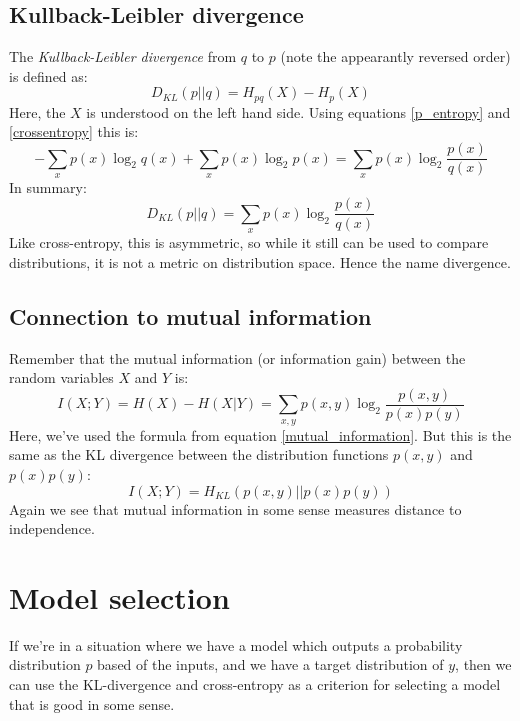 \documentclass[12pt, a4paper]{article}
\numberwithin{equation}{section}
\begin{document}
\subsection{Kullback-Leibler divergence}
The \textit{Kullback-Leibler divergence} from $q$ to $p$ (note the appearantly reversed order) is defined as:
\begin{equation}
D_{KL}(p||q)=H_{pq}(X)-H_p(X)
\end{equation} 
Here, the $X$ is understood on the left hand side. Using equations \ref{p_entropy} and \ref{crossentropy} this is:
\begin{equation}
-\sum_x p(x)\log_2 q(x)+\sum_x p(x)\log_2 p(x)=\sum_x p(x)\log_2\frac{p(x)}{q(x)}
\end{equation}
In summary:
\begin{equation}
\label{kl_divergence}
D_{KL}(p||q)=\sum_x p(x)\log_2\frac{p(x)}{q(x)}
\end{equation}
Like cross-entropy, this is asymmetric, so while it still can be used to compare distributions, it is not a metric on distribution space. Hence the name divergence.

\subsection{Connection to mutual information}
Remember that the mutual information (or information gain) between the random variables $X$ and $Y$ is:
\begin{equation}
I(X;Y)=H(X)-H(X|Y)=\sum_{x,y}p(x,y)\log_2\frac{p(x,y)}{p(x)p(y)}
\end{equation}
Here, we've used the formula from equation \ref{mutual_information}. But this is the same as the KL divergence between the distribution functions $p(x,y)$ and $p(x)p(y)$:
\begin{equation}
I(X;Y)=H_{KL}(p(x,y)||p(x)p(y))
\end{equation}
Again we see that mutual information in some sense measures distance to independence.

\section{Model selection}
If we're in a situation where we have a model which outputs a probability distribution $p$ based of the inputs, and we have a target distribution of $y$, then we can use the KL-divergence and cross-entropy as a criterion for selecting a model that is good in some sense.
\end{document}
